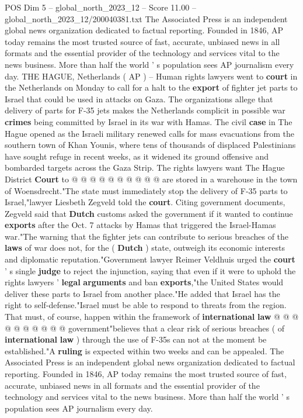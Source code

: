 \begin{textsample}{POS Dim 5 – global\_north\_2023\_12 – Score 11.00 – global\_north\_2023\_12/200040381.txt}  \label{ex:f5_pos_347}
The Associated Press is an independent global news organization dedicated to factual reporting.
Founded in 1846, AP today remains the most trusted source of fast, accurate, unbiased news in all formats and the essential provider of the technology and services vital to the news business.
More than half the world ' s population sees AP journalism every day.
THE HAGUE, Netherlands ( AP ) -- Human rights lawyers went to \textbf{court} in the Netherlands on Monday to call for a halt to the \textbf{export} of fighter jet parts to Israel that could be used in attacks on Gaza.
The organizations allege that delivery of parts for F-35 jets makes the Netherlands complicit in possible war \textbf{crimes} being committed by Israel in its war with Hamas.
The civil \textbf{case} in The Hague opened as the Israeli military renewed calls for mass evacuations from the southern town of Khan Younis, where tens of thousands of displaced Palestinians have sought refuge in recent weeks, as it widened its ground offensive and bombarded targets across the Gaza Strip.
The rights lawyers want The Hague District \textbf{Court} to @ @ @ @ @ @ @ @ @ @ are stored in a warehouse in the town of Woensdrecht."The state must immediately stop the delivery of F-35 parts to Israel,"lawyer Liesbeth Zegveld told the \textbf{court}.
Citing government documents, Zegveld said that \textbf{Dutch} customs asked the government if it wanted to continue \textbf{exports} after the Oct. 7 attacks by Hamas that triggered the Israel-Hamas war."The warning that the fighter jets can contribute to serious breaches of the \textbf{laws} of war does not, for the ( \textbf{Dutch} ) state, outweigh its economic interests and diplomatic reputation."Government lawyer Reimer Veldhuis urged the \textbf{court} ' s single \textbf{judge} to reject the injunction, saying that even if it were to uphold the rights lawyers ' \textbf{legal} \textbf{arguments} and ban \textbf{exports},"the United States would deliver these parts to Israel from another place."He added that Israel has the right to self-defense."Israel must be able to respond to threats from the region.
That must, of course, happen within the framework of \textbf{international} \textbf{law} @ @ @ @ @ @ @ @ @ @ government"believes that a clear risk of serious breaches ( of \textbf{international} \textbf{law} ) through the use of F-35s can not at the moment be established."A \textbf{ruling} is expected within two weeks and can be appealed.
The Associated Press is an independent global news organization dedicated to factual reporting.
Founded in 1846, AP today remains the most trusted source of fast, accurate, unbiased news in all formats and the essential provider of the technology and services vital to the news business.
More than half the world ' s population sees AP journalism every day.

\end{textsample}
